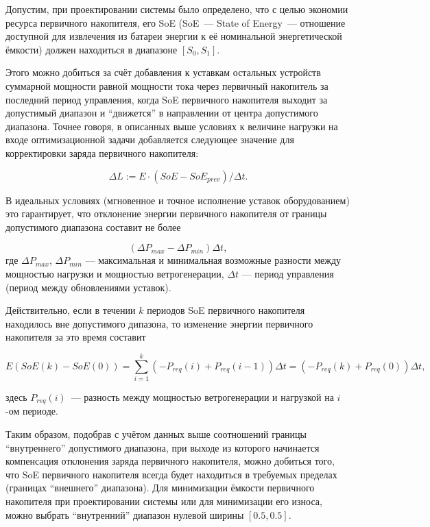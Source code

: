     Допустим, при проектировании системы было определено, что с целью экономии ресурса первичного накопителя, его SoE (SoE~--- State of Energy~--- отношение доступной для извлечения из батареи энергии к её номинальной энергетической ёмкости) должен находиться в диапазоне $[S_0, S_1]$.
    
    Этого можно добиться за счёт добавления к уставкам остальных устройств суммарной мощности равной мощности тока через первичный накопитель за последний период управления, когда SoE первичного накопителя выходит за допустимый диапазон и ``движется'' в направлении от центра допустимого диапазона.
    Точнее говоря, в описанных выше условиях к величине нагрузки на входе оптимизационной задачи добавляется следующее значение для корректировки заряда первичного накопителя:
    
    \begin{equation}
    \label{f:dL}
    \Delta L := E\cdot(SoE - SoE_{prev}) / \Delta t.
    \end{equation}
    
    В идеальных условиях (мгновенное и точное исполнение уставок оборудованием) это гарантирует, что отклонение энергии первичного накопителя от границы допустимого диапазона составит не более 
    
    \begin{equation}
    (\Delta P_{max} - \Delta P_{min})\Delta t, 
    \end{equation}
    где $\Delta P_{max}$, $\Delta P_{min}$  --- максимальная и минимальная возможные разности между мощностью нагрузки и мощностью ветрогенерации, $\Delta t$ --- период управления (период между обновлениями уставок).
    
    Действительно, если в течении $k$ периодов SoE первичного накопителя находилось вне допустимого дипазона, то изменение энергии первичного накопителя за это время составит
    
    \begin{equation}
        E(SoE(k) - SoE(0)) = \sum_{i=1}^k \left( -P_{req}(i) + P_{req}(i-1)\right) \Delta t = 
         \left( -P_{req}(k) + P_{req}(0) \right) \Delta t,
    \end{equation}
    
    здесь $P_{req}(i)$~--- разность между мощностью ветрогенерации и нагрузкой на $i$-ом периоде.
    
    Таким образом, подобрав с учётом данных выше соотношений границы ``внутреннего'' допустимого диапазона, при выходе из которого начинается компенсация отклонения заряда первичного накопителя, можно добиться того, что SoE первичного накопителя всегда будет находиться в требуемых пределах (границах ``внешнего'' диапазона).
    Для минимизации ёмкости первичного накопителя при проектировании системы или для минимизации его износа, можно выбрать ``внутренний'' диапазон нулевой ширины $[0.5, 0.5]$.
    
